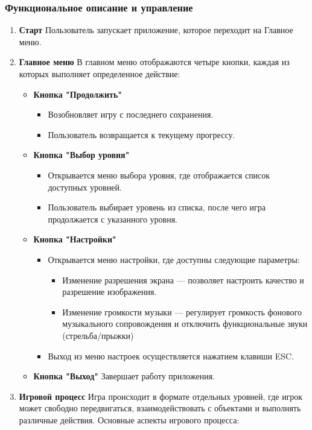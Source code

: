 \documentclass{article}
\begin{document}
\subsubsection{Функциональное описание и управление}
\begin{enumerate}
	\item \textbf{Старт} 
	Пользователь запускает приложение, которое переходит на Главное меню.
	\item \textbf{Главное меню} В главном меню отображаются четыре кнопки, каждая из которых выполняет определенное действие:
	\begin{itemize}
		\item \textbf{Кнопка "Продолжить"}
		\begin{itemize}
			\item Возобновляет игру с последнего сохранения.
			\item Пользователь возвращается к текущему прогрессу.
		\end{itemize}
		\item \textbf{Кнопка "Выбор уровня"}
		\begin{itemize}
			\item Открывается меню выбора уровня, где отображается список доступных уровней.
			\item Пользователь выбирает уровень из списка, после чего игра продолжается с указанного уровня.
		\end{itemize}
		\item \textbf{Кнопка "Настройки"}
		\begin{itemize}
			\item Открывается меню настройки, где доступны следующие параметры:
			\begin{itemize}
				\item Изменение разрешения экрана — позволяет настроить качество и разрешение изображения.
				\item Изменение громкости музыки — регулирует громкость фонового музыкального сопровождения и отключить функциональные звуки (стрельба/прыжки)
			\end{itemize}
			\item Выход из меню настроек осуществляется нажатием клавиши ESC.
		\end{itemize}
		\item \textbf{Кнопка "Выход"}
		Завершает работу приложения.
	\end{itemize}
	\item \textbf{Игровой процесс}
	Игра происходит в формате отдельных уровней, где игрок может свободно передвигаться, взаимодействовать с объектами и выполнять различные действия. Основные аспекты игрового процесса:

\end{enumerate}
\end{document}

